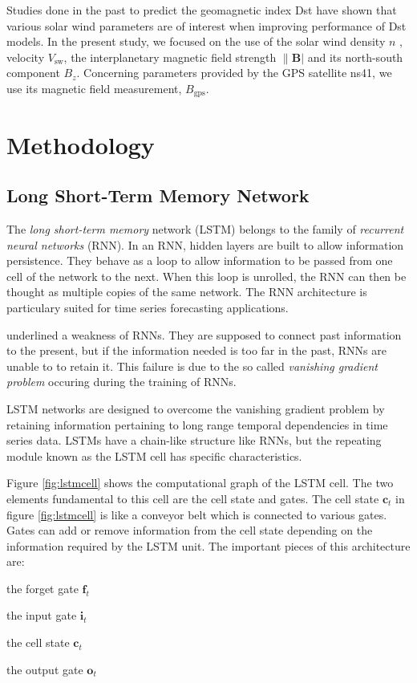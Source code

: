 Studies done in the past to predict the geomagnetic index Dst have shown that various solar wind parameters 
are of interest when improving performance of Dst models. In the present study, we focused on the use 
of the solar wind density $n$ , velocity  $V_{\text{sw}}$, the interplanetary magnetic field 
strength $\|\mathbf{B}|$ and its north-south component $B_{z}$. Concerning parameters provided by 
the GPS satellite ns41, we use its magnetic field measurement, $B_{\text{gps}}$.

\section{Methodology}\label{sec:methodgpnn}

\subsection{Long Short-Term Memory Network}\label{sec:lstmcomponent}

The \emph{long short-term memory} network (LSTM) belongs to the family of \emph{recurrent neural networks} (RNN). 
In an RNN, hidden layers are built to allow information persistence. They behave as a loop to allow information 
to be passed from one cell of the network to the next. When this loop is unrolled, the RNN can then be thought 
as multiple copies of the same network. The RNN architecture is particulary suited for time series forecasting 
applications. 

\citet{hochreiter1991untersuchungen,bengio1994learning} underlined a weakness of RNNs. They are supposed to connect 
past information to the present, but if the information needed is too far in the past, RNNs are unable to to retain it. 
This failure is due to the so called \emph{vanishing gradient problem} occuring during the training of RNNs. 

LSTM networks are designed to overcome the vanishing gradient problem by retaining information pertaining to long range 
temporal dependencies in time series data. LSTMs have a chain-like structure like RNNs, but the repeating module 
known as the LSTM cell has specific characteristics.

Figure \ref{fig:lstmcell} shows the computational graph of the LSTM cell. The two elements 
fundamental to this cell are the cell state and gates. The cell state $\mathbf{c}_{t}$ in figure \ref{fig:lstmcell} 
is like a conveyor belt which is connected to various gates. Gates can add or remove information from the cell 
state depending on the information required by the LSTM unit. The important pieces of this architecture are: 
\begin{itemize*} 
	\item the forget gate $\mathbf{f}_t$ 
	\item the input gate $\mathbf{i}_t$ 
	\item the cell state $\mathbf{c}_t$ 
	\item the output gate $\mathbf{o}_t$  
\end{itemize*}  


